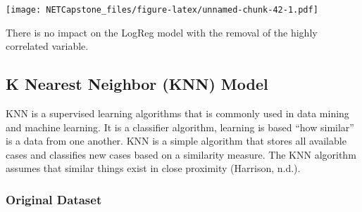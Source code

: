 \documentclass[
]{article}
\newenvironment{Shaded}{\begin{snugshade}}{\end{snugshade}}
\newcommand{\DataTypeTok}[1]{\textcolor[rgb]{0.13,0.29,0.53}{#1}}
\newcommand{\DecValTok}[1]{\textcolor[rgb]{0.00,0.00,0.81}{#1}}
\newcommand{\KeywordTok}[1]{\textcolor[rgb]{0.13,0.29,0.53}{\textbf{#1}}}
\newcommand{\NormalTok}[1]{#1}
\newcommand{\OperatorTok}[1]{\textcolor[rgb]{0.81,0.36,0.00}{\textbf{#1}}}
\newcommand{\StringTok}[1]{\textcolor[rgb]{0.31,0.60,0.02}{#1}}
\begin{document}
\texttt{[image: NETCapstone\_files/figure-latex/unnamed-chunk-42-1.pdf]}

There is no impact on the LogReg model with the removal of the highly
correlated variable.

\hypertarget{k-nearest-neighbor-knn-model}{%
\subsection{K Nearest Neighbor (KNN)
Model}\label{k-nearest-neighbor-knn-model}}

KNN is a supervised learning algorithms that is commonly used in data
mining and machine learning. It is a classifier algorithm, learning is
based ``how similar'' is a data from one another. KNN is a simple
algorithm that stores all available cases and classifies new cases based
on a similarity measure. The KNN algorithm assumes that similar things
exist in close proximity (Harrison, n.d.).

\hypertarget{original-dataset-4}{%
\subsubsection{Original Dataset}\label{original-dataset-4}}

\begin{Shaded}
\end{Shaded}
\end{document}
